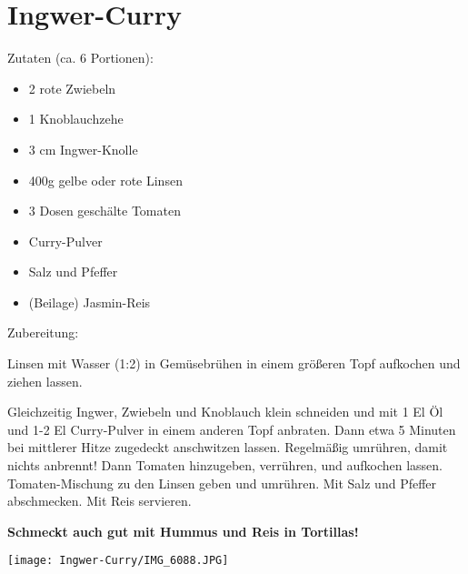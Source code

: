 \section{Ingwer-Curry}
Zutaten (ca. 6 Portionen):
\begin{itemize}
    \item 2 rote Zwiebeln
    \item 1 Knoblauchzehe
    \item 3 cm Ingwer-Knolle
    \item 400g gelbe oder rote Linsen
    \item 3 Dosen geschälte Tomaten
    \item Curry-Pulver
    \item Salz und Pfeffer
    \item (Beilage) Jasmin-Reis
\end{itemize}

\noindent Zubereitung:

\noindent Linsen mit Wasser (1:2) in Gemüsebrühen in einem größeren Topf aufkochen und ziehen lassen.

\noindent Gleichzeitig Ingwer, Zwiebeln und Knoblauch klein schneiden und mit 1 El Öl und 1-2 El Curry-Pulver in einem anderen Topf anbraten. Dann etwa 5 Minuten bei mittlerer Hitze zugedeckt anschwitzen lassen. Regelmäßig umrühren, damit nichts anbrennt! Dann Tomaten hinzugeben, verrühren, und aufkochen lassen. Tomaten-Mischung zu den Linsen geben und umrühren. Mit Salz und Pfeffer abschmecken. Mit Reis servieren.

\noindent \textbf{Schmeckt auch gut mit Hummus und Reis in Tortillas!}

\newpage
\mbox{}
\vfill
\begin{center}
    \texttt{[image: Ingwer-Curry/IMG\_6088.JPG]}
\end{center}
\vfill
\mbox{ }
\newpage

